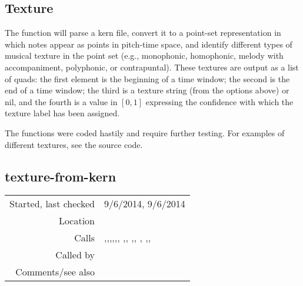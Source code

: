 \subsection{Texture}\label{sec:texture}

The function
 will parse a kern
file, convert it to a point-set representation in
which notes appear as points in pitch-time space, and
identify different types of musical texture in the
point set (e.g., monophonic, homophonic, melody with
accompaniment, polyphonic, or contrapuntal). These
textures are output as a list of quads: the first
element is the beginning of a time window; the second
is the end of a time window; the third is a texture
string (from the options above) or nil, and the fourth
is a value in $[0, 1]$ expressing the confidence with
which the texture label has been assigned.

The functions were coded hastily and require further
testing. For examples of different textures, see the source
code.


\subsection*{texture-from-kern}\label{fun:texture-from-kern}

\vspace{0.3cm}
\begin{tabular}{r|p{8cm}}
Started, last checked & 9/6/2014, 9/6/2014 \\
Location & \nameref{sec:texture} \\
Calls & \nameref{fun:append-offtimes},\newline \nameref{fun:append-ontimes-to-time-signatures},\newline \nameref{fun:bar-n-beat-number-of-ontime},\newline \nameref{fun:datapoints-sounding-between},\newline \nameref{fun:increment-by-x-n-times},\newline \nameref{fun:kern-file2dataset-by-col}, \nameref{fun:kern-file2lyrics-tf},\newline \nameref{fun:kern-file2ontimes-signatures}, \nameref{fun:max-item},\newline \nameref{fun:min-item}, \nameref{fun:my-last}, \nameref{fun:nth-list-of-lists},\newline \nameref{fun:ontime-of-bar-n-beat-number},\newline \nameref{fun:texture-whole-point-set} \\
Called by & \nameref{fun:Stravinsqi-Jun2014} \\
Comments/see also &
\end{tabular}

